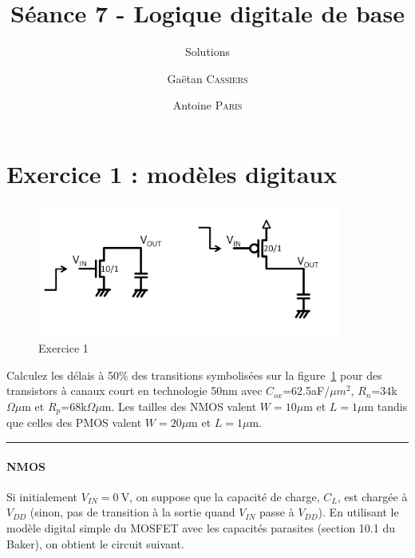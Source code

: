 \documentclass[frenchb,DIV=14]{scrartcl}
\title{Séance 7 - Logique digitale de base}
\subtitle{Solutions}
\author{\small Gaëtan \textsc{Cassiers} \and\small Antoine \textsc{Paris}}
\date{}
\begin{document}
\maketitle

\section*{Exercice 1 : modèles digitaux}

\begin{figure}[!htbp]
   	\centering
   	\includegraphics[width=10cm]{figures/fig7-1.png}
   	\caption{Exercice 1}
   	\label{fig7-1}
\end{figure}

Calculez les délais à 50\% des transitions symbolisées sur la figure~\ref{fig7-1}
pour des transistors à canaux court en technologie 50nm avec $C_{ox}$=62.5aF/$\mu m^2$,
$R_n$=34k$\Omega\mu$m et $R_p$=68k$\Omega\mu$m.
Les tailles des NMOS valent $W=10\mu$m et $L=1\mu$m tandis que celles des PMOS valent
$W=20\mu$m et $L=1\mu$m.

\hspace{1cm}\hrule

\paragraph{NMOS}
Si initialement $V_{IN} = \SI{0}{\volt}$, on suppose que la capacité de charge,
$C_L$, est chargée à $V_{DD}$ (sinon, pas de transition à la sortie quand $V_{IN}$
passe à $V_{DD}$). En utilisant le modèle digital simple du MOSFET avec les
capacités parasites (section 10.1 du Baker), on obtient le circuit suivant.

\begin{center}
\end{center}
\end{document}
